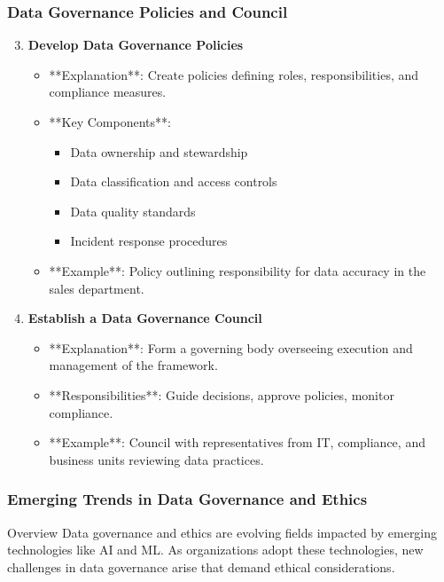 \documentclass[aspectratio=169]{beamer}
\begin{document}
\begin{frame}[fragile]
    \frametitle{Data Governance Policies and Council}
    \begin{enumerate}
        \setcounter{enumi}{2}
        \item \textbf{Develop Data Governance Policies}
            \begin{itemize}
                \item **Explanation**: Create policies defining roles, responsibilities, and compliance measures.
                \item **Key Components**: 
                    \begin{itemize}
                        \item Data ownership and stewardship
                        \item Data classification and access controls
                        \item Data quality standards
                        \item Incident response procedures
                    \end{itemize}
                \item **Example**: Policy outlining responsibility for data accuracy in the sales department.
            \end{itemize}
        
        \item \textbf{Establish a Data Governance Council}
            \begin{itemize}
                \item **Explanation**: Form a governing body overseeing execution and management of the framework.
                \item **Responsibilities**: Guide decisions, approve policies, monitor compliance.
                \item **Example**: Council with representatives from IT, compliance, and business units reviewing data practices.
            \end{itemize}
    \end{enumerate}
\end{frame}

\begin{frame}[fragile]
    \frametitle{Emerging Trends in Data Governance and Ethics}
    \begin{block}{Overview}
        Data governance and ethics are evolving fields impacted by emerging technologies like AI and ML. As organizations adopt these technologies, new challenges in data governance arise that demand ethical considerations.
    \end{block}
\end{frame}
\end{document}
